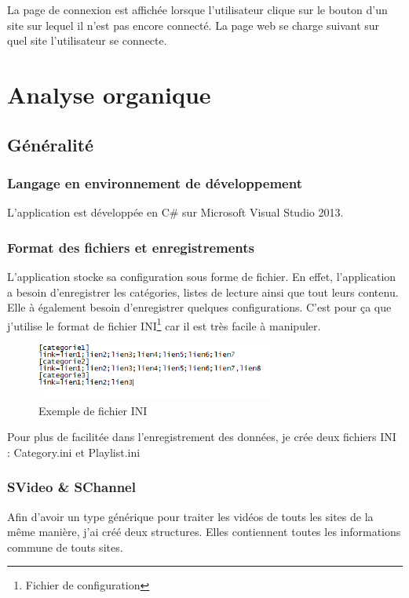 \documentclass[11pt]{report} %
\begin{document}
		La page de connexion est affichée lorsque l'utilisateur clique sur le bouton d'un site sur lequel il n'est pas encore connecté. La page web se charge suivant sur quel site l'utilisateur se connecte.
		
\chapter{Analyse organique}
	\section{Généralité}
		\subsection{Langage en environnement de développement}
		L'application est développée en C\# sur Microsoft Visual Studio 2013. 
		
		\subsection{Format des fichiers et enregistrements}
		L'application stocke sa configuration sous forme de fichier. En effet, l'application a besoin d'enregistrer les catégories, listes de lecture ainsi que tout leurs contenu. Elle à également besoin d'enregistrer quelques configurations. C'est pour ça que j'utilise le format de fichier INI\footnote{Fichier de configuration} car il est très facile à manipuler. 
		
		\begin{figure}[h]
			\center
			\includegraphics[width=0.7\textwidth]{../img/inifile.png}
			\caption{Exemple de fichier INI}
			\label{inifile}
		\end{figure}
		
		Pour plus de facilitée dans l'enregistrement des données, je crée deux fichiers INI : Category.ini et Playlist.ini
			
		\newpage
		
		\subsection{SVideo \& SChannel}
			Afin d'avoir un type générique pour traiter les vidéos de touts les sites de la même manière, j'ai créé deux structures. Elles contiennent toutes les informations commune de touts sites.
			
\end{document}
